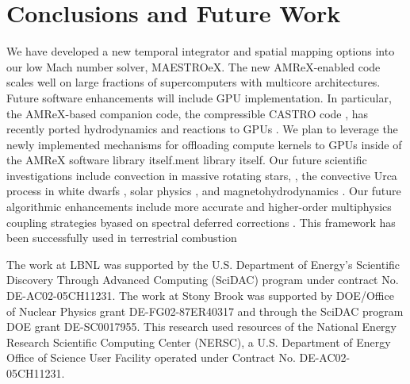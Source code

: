 \section{Conclusions and Future Work}\label{sec:conclusions}
We have developed a new temporal integrator and spatial mapping options into our low Mach number solver, MAESTROeX.
The new AMReX-enabled code scales well on large fractions of supercomputers with multicore architectures.
Future software enhancements will include GPU implementation.
In particular, the AMReX-based companion code, the compressible CASTRO code \citep{CASTRO}, has recently ported hydrodynamics and reactions to GPUs \citep{CASTRO_GPU}.
We plan to leverage the newly implemented mechanisms for offloading compute kernels to GPUs inside of the AMReX software library itself.ment library itself.
Our future scientific investigations include convection in massive rotating stars, \citep{heger2000presupernova}, the convective Urca process in white dwarfs \citep{willcox2016type}, solar physics \citep{wood2018self}, and magnetohydrodynamics \citep{wood2015three,wood2011sun}.
Our future algorithmic enhancements include more accurate and higher-order multiphysics coupling strategies byased on spectral deferred corrections \citep{dutt2000spectral,bourlioux2003high}.
This framework has been successfully used in terrestrial combustion \citep{pazner2016high,nonaka2018conservative}

\acknowledgements

The work at LBNL was supported by the U.S. Department of Energy's
Scientific Discovery Through Advanced Computing (SciDAC) program under
contract No. DE-AC02-05CH11231.  The work at Stony Brook was supported
by DOE/Office of Nuclear Physics grant DE-FG02-87ER40317 and through
the SciDAC program DOE grant DE-SC0017955.  This research used
resources of the National Energy Research Scientific Computing Center
(NERSC), a U.S. Department of Energy Office of Science User Facility
operated under Contract No. DE-AC02-05CH11231.


